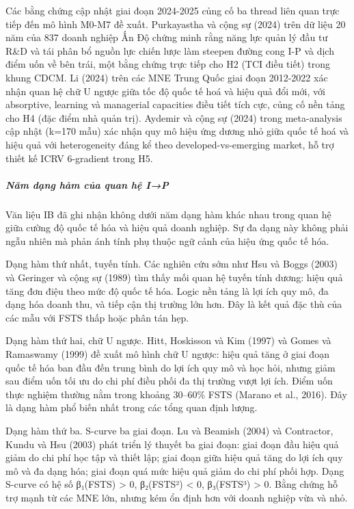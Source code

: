 \documentclass[12pt,a4paper]{article}
\begin{document}
Các bằng chứng cập nhật giai đoạn 2024-2025 củng cố ba thread liên quan
trực tiếp đến mô hình M0-M7 đề xuất. Purkayastha và cộng sự (2024) trên
dữ liệu 20 năm của 837 doanh nghiệp Ấn Độ chứng minh rằng năng lực quản
lý đầu tư R\&D và tái phân bổ nguồn lực chiến lược làm steepen đường
cong I-P và dịch điểm uốn về bên trái, một bằng chứng trực tiếp cho H2
(TCI điều tiết) trong khung CDCM. Li (2024) trên các MNE Trung Quốc giai
đoạn 2012-2022 xác nhận quan hệ chữ U ngược giữa tốc độ quốc tế hoá và
hiệu quả đổi mới, với absorptive, learning và managerial capacities điều
tiết tích cực, củng cố nền tảng cho H4 (đặc điểm nhà quản trị). Aydemir
và cộng sự (2024) trong meta-analysis cập nhật (k=170 mẫu) xác nhận quy
mô hiệu ứng dương nhỏ giữa quốc tế hoá và hiệu quả với heterogeneity
đáng kể theo developed-vs-emerging market, hỗ trợ thiết kế ICRV
6-gradient trong H5.

\hypertarget{nux103m-dux1ea1ng-huxe0m-cux1ee7a-quan-hux1ec7-ip}{%
\subparagraph{Năm dạng hàm của quan hệ
I→P}\label{nux103m-dux1ea1ng-huxe0m-cux1ee7a-quan-hux1ec7-ip}}

Văn liệu IB đã ghi nhận không dưới năm dạng hàm khác nhau trong quan hệ
giữa cường độ quốc tế hóa và hiệu quả doanh nghiệp. Sự đa dạng này không
phải ngẫu nhiên mà phản ánh tính phụ thuộc ngữ cảnh của hiệu ứng quốc tế
hóa.

Dạng hàm thứ nhất, tuyến tính. Các nghiên cứu sớm như Hsu và Boggs
(2003) và Geringer và cộng sự (1989) tìm thấy mối quan hệ tuyến tính
dương: hiệu quả tăng đơn điệu theo mức độ quốc tế hóa. Logic nền tảng là
lợi ích quy mô, đa dạng hóa doanh thu, và tiếp cận thị trường lớn hơn.
Đây là kết quả đặc thù của các mẫu với FSTS thấp hoặc phân tán hẹp.

Dạng hàm thứ hai, chữ U ngược. Hitt, Hoskisson và Kim (1997) và Gomes và
Ramaswamy (1999) đề xuất mô hình chữ U ngược: hiệu quả tăng ở giai đoạn
quốc tế hóa ban đầu đến trung bình do lợi ích quy mô và học hỏi, nhưng
giảm sau điểm uốn tối ưu do chi phí điều phối đa thị trường vượt lợi
ích. Điểm uốn thực nghiệm thường nằm trong khoảng 30--60\% FSTS (Marano
et al., 2016). Đây là dạng hàm phổ biến nhất trong các tổng quan định
lượng.

Dạng hàm thứ ba. S-curve ba giai đoạn. Lu và Beamish (2004) và
Contractor, Kundu và Hsu (2003) phát triển lý thuyết ba giai đoạn: giai
đoạn đầu hiệu quả giảm do chi phí học tập và thiết lập; giai đoạn giữa
hiệu quả tăng do lợi ích quy mô và đa dạng hóa; giai đoạn quá mức hiệu
quả giảm do chi phí phối hợp. Dạng S-curve có hệ số β₁(FSTS)
\textgreater{} 0, β₂(FSTS²) \textless{} 0, β₃(FSTS³) \textgreater{} 0.
Bằng chứng hỗ trợ mạnh từ các MNE lớn, nhưng kém ổn định hơn với doanh
nghiệp vừa và nhỏ.
\end{document}
